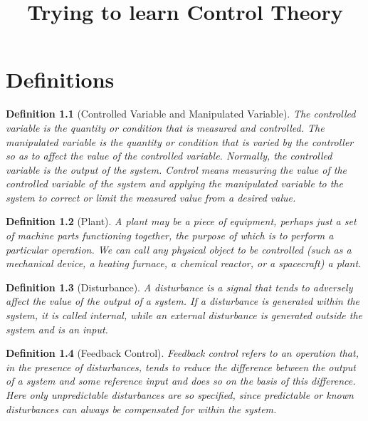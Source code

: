 \documentclass[]{report}
\title{Trying to learn Control Theory}
\newtheorem{defi}{Definition}
\begin{document}

\maketitle
\tableofcontents

\chapter{Definitions}
\begin{defi}[Controlled Variable and Manipulated Variable]
	The controlled variable is the quantity or condition that is measured and controlled. 
	The manipulated variable is the quantity or condition that is varied by the controller so as to affect the value of the controlled variable. 
	Normally, the controlled variable is the output of the system.
	Control means measuring the value of the controlled variable of the system and applying the manipulated variable to the system to correct or limit the measured value from a desired value.
\end{defi}
\begin{defi}[Plant]
	A plant may be a piece of equipment, perhaps just a set of machine parts functioning together, the purpose of which is to perform a particular operation. 
	We can call any physical object to be controlled (such as a mechanical device, a heating furnace, a chemical reactor, or a spacecraft) a plant.
\end{defi}
\begin{defi}[Disturbance]
	A disturbance is a signal that tends to adversely affect the value of the output of a system. 
	If a disturbance is generated within the system, it is called internal, while an external disturbance is generated outside the system and is an input.
\end{defi}
\begin{defi}[Feedback Control]
	Feedback control refers to an operation that, in the presence of disturbances, tends to reduce the difference between the output of a system and some reference input and does so on the basis of this difference. 
	Here only unpredictable disturbances are so specified, since predictable or known disturbances can always be compensated for within the system.
\end{defi}
\end{document}
